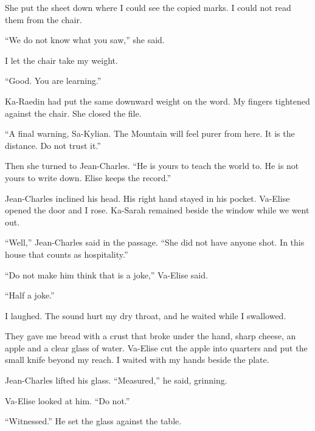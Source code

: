 She put the sheet down where I could see the copied marks. I could not read them from the chair.\par

``We do not know what you saw,'' she said.\par

I let the chair take my weight.\par

``Good. You are learning.''\par

Ka-Raedin had put the same downward weight on the word. My fingers tightened against the chair. She closed the file.\par

``A final warning, Sa-Kylian. The Mountain will feel purer from here. It is the distance. Do not trust it.''\par

Then she turned to Jean-Charles. ``He is yours to teach the world to. He is not yours to write down. Elise keeps the record.''\par

Jean-Charles inclined his head. His right hand stayed in his pocket. Va-Elise opened the door and I rose. Ka-Sarah remained beside the window while we went out.\par

``Well,'' Jean-Charles said in the passage. ``She did not have anyone shot. In this house that counts as hospitality.''\par

``Do not make him think that is a joke,'' Va-Elise said.\par

``Half a joke.''\par

I laughed. The sound hurt my dry throat, and he waited while I swallowed.\par

They gave me bread with a crust that broke under the hand, sharp cheese, an apple and a clear glass of water. Va-Elise cut the apple into quarters and put the small knife beyond my reach. I waited with my hands beside the plate.\par

Jean-Charles lifted his glass. ``Measured,'' he said, grinning.\par

Va-Elise looked at him. ``Do not.''\par

``Witnessed.'' He set the glass against the table.\par

